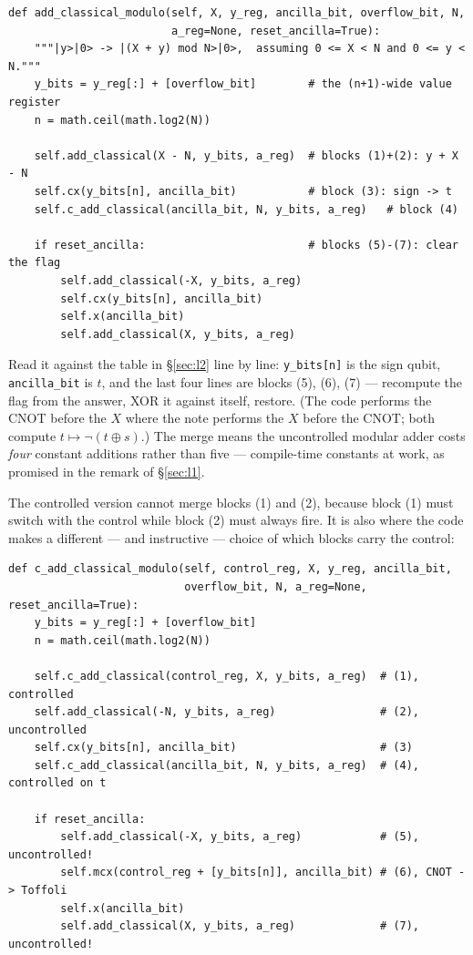\documentclass[11pt]{article}
\newcommand{\code}[1]{\texttt{#1}}
\theoremstyle{plain}
\theoremstyle{remark}
\begin{document}
\begin{lstlisting}
def add_classical_modulo(self, X, y_reg, ancilla_bit, overflow_bit, N,
                         a_reg=None, reset_ancilla=True):
    """|y>|0> -> |(X + y) mod N>|0>,  assuming 0 <= X < N and 0 <= y < N."""
    y_bits = y_reg[:] + [overflow_bit]        # the (n+1)-wide value register
    n = math.ceil(math.log2(N))

    self.add_classical(X - N, y_bits, a_reg)  # blocks (1)+(2): y + X - N
    self.cx(y_bits[n], ancilla_bit)           # block (3): sign -> t
    self.c_add_classical(ancilla_bit, N, y_bits, a_reg)   # block (4)

    if reset_ancilla:                         # blocks (5)-(7): clear the flag
        self.add_classical(-X, y_bits, a_reg)
        self.cx(y_bits[n], ancilla_bit)
        self.x(ancilla_bit)
        self.add_classical(X, y_bits, a_reg)
\end{lstlisting}

\noindent
Read it against the table in \S\ref{sec:l2} line by line: \code{y\_bits[n]} is the sign qubit,
\code{ancilla\_bit} is $t$, and the last four lines are blocks (5), (6), (7) --- recompute the flag
from the answer, XOR it against itself, restore. (The code performs the CNOT before the $X$ where
the note performs the $X$ before the CNOT; both compute $t\mapsto\neg(t\oplus s)$.) The merge
means the uncontrolled modular adder costs \emph{four} constant additions rather than five ---
compile-time constants at work, as promised in the remark of \S\ref{sec:l1}.

The controlled version cannot merge blocks (1) and (2), because block (1) must switch with the
control while block (2) must always fire. It is also where the code makes a different --- and
instructive --- choice of which blocks carry the control:

\begin{lstlisting}
def c_add_classical_modulo(self, control_reg, X, y_reg, ancilla_bit,
                           overflow_bit, N, a_reg=None, reset_ancilla=True):
    y_bits = y_reg[:] + [overflow_bit]
    n = math.ceil(math.log2(N))

    self.c_add_classical(control_reg, X, y_bits, a_reg)  # (1), controlled
    self.add_classical(-N, y_bits, a_reg)                # (2), uncontrolled
    self.cx(y_bits[n], ancilla_bit)                      # (3)
    self.c_add_classical(ancilla_bit, N, y_bits, a_reg)  # (4), controlled on t

    if reset_ancilla:
        self.add_classical(-X, y_bits, a_reg)            # (5), uncontrolled!
        self.mcx(control_reg + [y_bits[n]], ancilla_bit) # (6), CNOT -> Toffoli
        self.x(ancilla_bit)
        self.add_classical(X, y_bits, a_reg)             # (7), uncontrolled!
\end{lstlisting}
\end{document}
